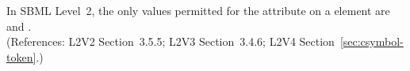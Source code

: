 In SBML Level~2, the only values permitted for the
 attribute on a  element are
 and
.\\
(References: L2V2 Section~3.5.5; L2V3 Section~3.4.6; 
L2V4 Section~\ref{sec:csymbol-token}.)
